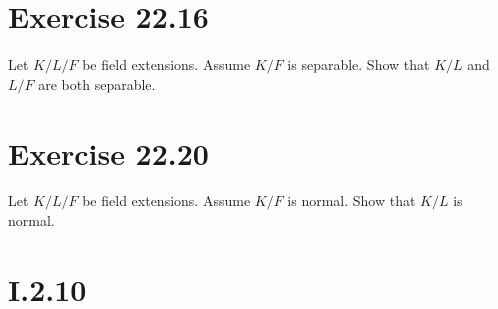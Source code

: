 \documentclass[fleqn]{article}
\begin{document}
    \section{Exercise 22.16}
    Let $K/L/F$ be field extensions.  Assume $K/F$ is separable.  Show that $K/L$ and $L/F$ are both separable.
    
    \section{Exercise 22.20}
    Let $K/L/F$ be field extensions.  Assume $K/F$ is normal.  Show that $K/L$ is normal.
    
    \section{I.2.10}
    
        
    
\end{document}
